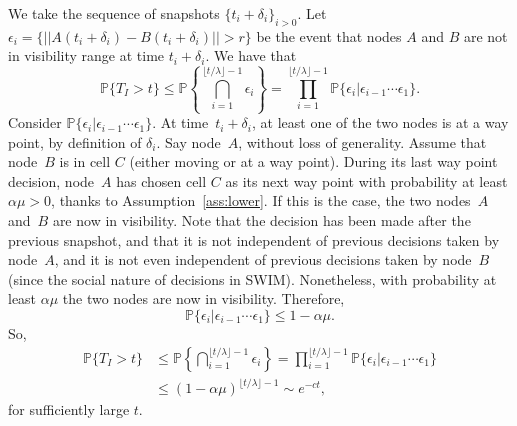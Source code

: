 \documentclass[conference]{IEEEtran}
\begin{document}
\begin{IEEEproof}
We take the sequence of snapshots $\{t_i+\delta_i\}_{i>0}$. Let $\epsilon_i=\{||A(t_i+\delta_i)-B(t_i+\delta_i)||>r\}$ be the event that nodes $A$ and $B$ are not in visibility range at time $t_i+\delta_i$. We have that
\begin{equation*}
\mathbb{P}\{T_I>t\}\le \mathbb{P}\left\{\bigcap_{i=1}^{\lfloor t/\lambda\rfloor
-1}
\epsilon_i\right\}=\prod_{i=1}^{\lfloor t/\lambda\rfloor -1}
\mathbb{P}\{ \epsilon_i| \epsilon_{i-1}\cdots\epsilon_1\}.
\end{equation*}
Consider $\mathbb{P}\{ \epsilon_i| \epsilon_{i-1}\cdots\epsilon_1\}$. At
time~$t_i+\delta_i$, at least one of the two nodes is at a way point, by
definition of $\delta_i$. Say node~$A$, without loss of generality. Assume that
node~$B$ is in cell $C$ (either moving or at a way point). During its last way
point decision, node~$A$ has chosen cell $C$ as its next way point with
probability at least $\alpha\mu>0$, thanks to Assumption~\ref{ass:lower}. If
this is the case, the two nodes~$A$ and~$B$ are now in visibility. Note that the
decision has been made after the previous snapshot, and that it is not
independent of previous decisions taken by node~$A$, and it is not even
independent of previous decisions taken by node~$B$ (since the social nature of
decisions in SWIM). Nonetheless, with probability at least $\alpha\mu$ the two
nodes are now in visibility. Therefore,
\begin{equation*}
\mathbb{P}\{ \epsilon_i| \epsilon_{i-1}\cdots\epsilon_1\}\le 1-\alpha\mu.
\end{equation*}
So,
\begin{equation*}
\begin{split}
\mathbb{P}\{T_I>t\} & \le \mathbb{P}\left\{\bigcap_{i=1}^{\lfloor
t/\lambda\rfloor -1}
\epsilon_i\right\}=\prod_{i=1}^{\lfloor t/\lambda\rfloor -1}
\mathbb{P}\{ \epsilon_i| \epsilon_{i-1}\cdots\epsilon_1\}\\
 & \le (1-\alpha\mu)^{\lfloor t/\lambda\rfloor -1}\sim e^{-ct},
\end{split}
\end{equation*}
for sufficiently large $t$.
\end{IEEEproof}
\end{document}
